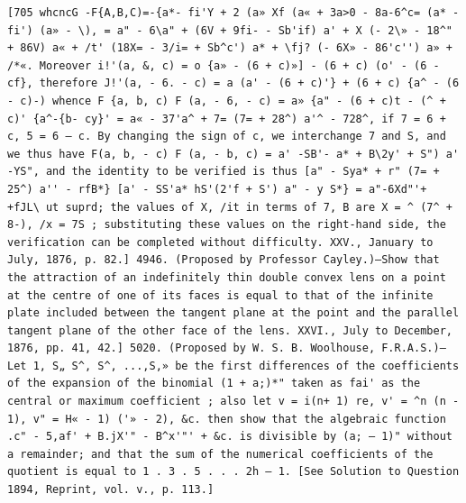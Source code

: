 \documentclass[12pt]{article}
\theoremstyle{plain}
\begin{document}
\newpage
\setcounter{page}{594}
\begin{verbatim}
[705 whcncG -F{A,B,C)=-{a*- fi'Y + 2 (a» Xf (a« + 3a>0 - 8a-6^c= (a* - fi') (a» - \), = a" - 6\a" + (6V + 9fi- - Sb'if) a' + X (- 2\» - 18^" + 86V) a« + /t' (18X= - 3/i= + Sb^c') a* + \fj? (- 6X» - 86'c'') a» + /*«. Moreover i!'(a, &, c) = o {a» - (6 + c)»] - (6 + c) (o' - (6 - cf}, therefore J!'(a, - 6. - c) = a (a' - (6 + c)'} + (6 + c) {a^ - (6 - c)-) whence F {a, b, c) F (a, - 6, - c) = a» {a" - (6 + c)t - (^ + c)' {a^-{b- cy}' = a« - 37'a^ + 7= (7= + 28^) a'^ - 728^, if 7 = 6 + c, 5 = 6 — c. By changing the sign of c, we interchange 7 and S, and we thus have F(a, b, - c) F (a, - b, c) = a' -SB'- a* + B\2y' + S") a' -YS", and the identity to be verified is thus [a" - Sya* + r" (7= + 25^) a'' - rfB*} [a' - SS'a* hS'(2'f + S') a" - y S*} = a"-6Xd"'+ +fJL\ ut suprd; the values of X, /it in terms of 7, B are X = ^ (7^ + 8-), /x = 7S ; substituting these values on the right-hand side, the verification can be completed without difficulty. XXV., January to July, 1876, p. 82.] 4946. (Proposed by Professor Cayley.)—Show that the attraction of an indefinitely thin double convex lens on a point at the centre of one of its faces is equal to that of the infinite plate included between the tangent plane at the point and the parallel tangent plane of the other face of the lens. XXVI., July to December, 1876, pp. 41, 42.] 5020. (Proposed by W. S. B. Woolhouse, F.R.A.S.)—Let 1, S„ S^, S^, ...,S,» be the first differences of the coefficients of the expansion of the binomial (1 + a;)*" taken as fai' as the central or maximum coefficient ; also let v = i(n+ 1) re, v' = ^n (n - 1), v" = H« - 1) ('» - 2), &c. then show that the algebraic function .c" - 5,af' + B.jX'" - B^x'"' + &c. is divisible by (a; — 1)" without a remainder; and that the sum of the numerical coefficients of the quotient is equal to 1 . 3 . 5 . . . 2h — 1. [See Solution to Question 1894, Reprint, vol. v., p. 113.] 
\end{verbatim}
\end{document}
